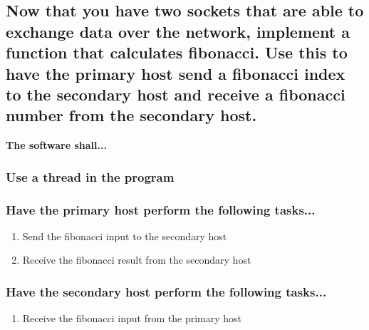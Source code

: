 \documentclass{article}
\begin{document}
	\begin{Large}
		\subsection{\textbf{Now that you have two sockets that are able to exchange data over the network, implement a function that calculates fibonacci. Use this to have the primary host send a fibonacci index to the secondary host and receive a fibonacci number from the secondary host.}}
		\vspace{48pt}
		
		\textbf{The software shall...}
		\subsubsection{Use a thread in the program}
		\subsubsection{Have the primary host perform the following tasks...}
		\begin{enumerate}
			\item Send the fibonacci input to the secondary host
			\item Receive the fibonacci result from the secondary host
		\end{enumerate}
		
		\subsubsection{Have the secondary host perform the following tasks...}
		\begin{enumerate}
			\item Receive the fibonacci input from the primary host
		\end{enumerate}
	\end{Large}
\end{document}
